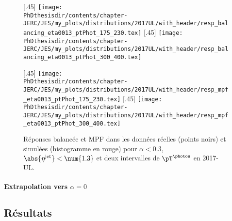 \begin{figure}[h]
\centering
\subcaptionbox{Réponse balancée pour $\pT^{\photon}\in[175, 230[$ \SI{}{\GeV}.\label{subfig-distrib_Gjets_17UL_resp_balancing_eta0013_ptPhot_175_230}}[.45\textwidth]
{\texttt{[image: \\PhDthesisdir/contents/chapter-JERC/JES/my\_plots/distributions/2017UL/with\_header/resp\_balancing\_eta0013\_ptPhot\_175\_230.tex]}}
\hfill
\subcaptionbox{Réponse balancée pour $\pT^{\photon}\in[300, 400[$ \SI{}{\GeV}.\label{subfig-distrib_Gjets_17UL_resp_balancing_eta0013_ptPhot_300_400}}[.45\textwidth]
{\texttt{[image: \\PhDthesisdir/contents/chapter-JERC/JES/my\_plots/distributions/2017UL/with\_header/resp\_balancing\_eta0013\_ptPhot\_300\_400.tex]}}

\vfill

\subcaptionbox{Réponse MPF pour $\pT^{\photon}\in[175, 230[$ \SI{}{\GeV}.\label{subfig-distrib_Gjets_17UL_resp_mpf_eta0013_ptPhot_175_230}}[.45\textwidth]
{\texttt{[image: \\PhDthesisdir/contents/chapter-JERC/JES/my\_plots/distributions/2017UL/with\_header/resp\_mpf\_eta0013\_ptPhot\_175\_230.tex]}}
\hfill
\subcaptionbox{Réponse MPF pour $\pT^{\photon}\in[300, 400[$ \SI{}{\GeV}.\label{subfig-distrib_Gjets_17UL_resp_mpf_eta0013_ptPhot_300_400}}[.45\textwidth]
{\texttt{[image: \\PhDthesisdir/contents/chapter-JERC/JES/my\_plots/distributions/2017UL/with\_header/resp\_mpf\_eta0013\_ptPhot\_300\_400.tex]}}

\caption[Réponses balancée et MPF en 2017-UL.]{Réponses balancée et MPF dans les données réelles (points noirs) et simulées (histogramme en rouge) pour $\alpha<\num{0.3}$, $\abs{\eta^\text{jet}}<\num{1.3}$ et deux intervalles de $\pT^{\photon}$ en 2017-UL.}
\label{fig-distribs_Gjets_17UL_resp_bal_and_mpf}
\end{figure}


\paragraph{Extrapolation vers $\alpha=0$}



\subsection{Résultats}\label{chapter-JERC-section-JES-subsec-results}
